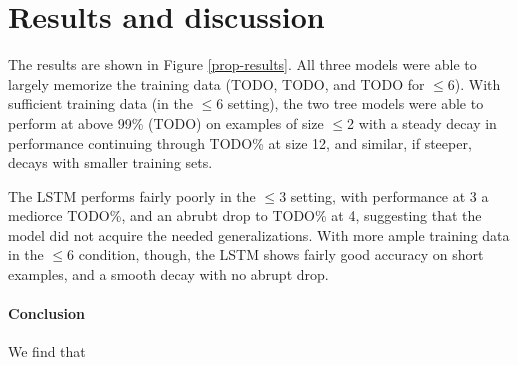 \section{Results and discussion}\label{sec:discussion}

The results are shown in Figure \ref{prop-results}. All three models were able to largely memorize the training data (TODO, TODO, and TODO for $\le$6). With sufficient training data (in the $\le$6 setting), the two tree models were able to perform at above 99\% (TODO) on examples of size $\le$2 with a steady decay in performance continuing through TODO\% at size 12, and similar, if steeper, decays with smaller training sets.

The LSTM performs fairly poorly in the $\le3$ setting, with performance at 3 a mediorce TODO\%, and an abrubt drop to TODO\% at 4, suggesting that the model did not acquire the needed generalizations. With more ample training data in the $\le6$ condition, though, the LSTM shows fairly good accuracy on short examples, and a smooth decay with no abrupt drop. 

\paragraph{Conclusion}

We find that 
